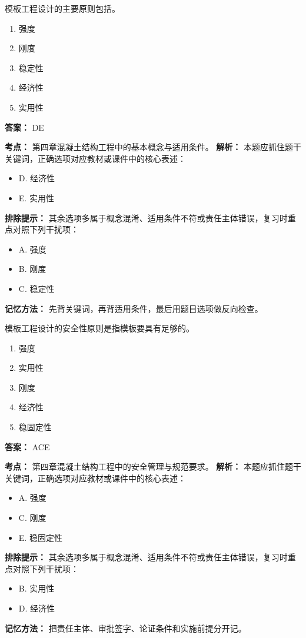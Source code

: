 \documentclass[UTF8,fontset=fandol,11pt]{ctexart}
\begin{document}
\begin{quizbox}[title={第 22 题}]
模板工程设计的主要原则包括。\\
\begin{enumerate}[label=\Alph*.]
\item 强度
\item 刚度
\item 稳定性
\item 经济性
\item 实用性
\end{enumerate}
\textbf{答案：} DE
\vspace{0.25em}
\begin{answerbox}[title={考点解析}]
\textbf{考点：} 第四章混凝土结构工程中的基本概念与适用条件。
\textbf{解析：} 本题应抓住题干关键词，正确选项对应教材或课件中的核心表述：
\begin{itemize}
\item D. 经济性
\item E. 实用性
\end{itemize}
\textbf{排除提示：} 其余选项多属于概念混淆、适用条件不符或责任主体错误，复习时重点对照下列干扰项：
\begin{itemize}
\item A. 强度
\item B. 刚度
\item C. 稳定性
\end{itemize}
\textbf{记忆方法：} 先背关键词，再背适用条件，最后用题目选项做反向检查。
\end{answerbox}
\end{quizbox}

\vspace{0.2em}

\begin{quizbox}[title={第 23 题}]
模板工程设计的安全性原则是指模板要具有足够的。\\
\begin{enumerate}[label=\Alph*.]
\item 强度
\item 实用性
\item 刚度
\item 经济性
\item 稳固定性
\end{enumerate}
\textbf{答案：} ACE
\vspace{0.25em}
\begin{answerbox}[title={考点解析}]
\textbf{考点：} 第四章混凝土结构工程中的安全管理与规范要求。
\textbf{解析：} 本题应抓住题干关键词，正确选项对应教材或课件中的核心表述：
\begin{itemize}
\item A. 强度
\item C. 刚度
\item E. 稳固定性
\end{itemize}
\textbf{排除提示：} 其余选项多属于概念混淆、适用条件不符或责任主体错误，复习时重点对照下列干扰项：
\begin{itemize}
\item B. 实用性
\item D. 经济性
\end{itemize}
\textbf{记忆方法：} 把责任主体、审批签字、论证条件和实施前提分开记。
\end{answerbox}
\end{quizbox}
\end{document}
